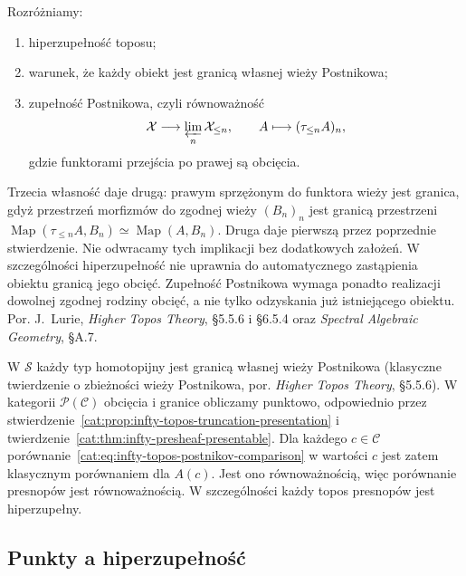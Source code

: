 \begin{uwaga}\label{cat:rem:infty-topos-postnikov-distinctions}
Rozróżniamy:
\begin{enumerate}
 \item hiperzupełność toposu;
 \item warunek, że każdy obiekt jest granicą własnej wieży Postnikowa;
 \item zupełność Postnikowa, czyli równoważność
 \[
 \mathcal X\longrightarrow
 \varprojlim_n\mathcal X_{\leq n},
 \qquad A\longmapsto(\tau_{\leq n}A)_n,
 \]
 gdzie funktorami przejścia po prawej są obcięcia.
\end{enumerate}
Trzecia własność daje drugą: prawym sprzężonym do funktora wieży jest granica, gdyż przestrzeń morfizmów do zgodnej wieży $(B_n)_n$ jest granicą przestrzeni $\operatorname{Map}(\tau_{\leq n}A,B_n)\simeq\operatorname{Map}(A,B_n)$. Druga daje pierwszą przez poprzednie stwierdzenie. Nie odwracamy tych implikacji bez dodatkowych założeń. W szczególności hiperzupełność nie uprawnia do automatycznego zastąpienia obiektu granicą jego obcięć. Zupełność Postnikowa wymaga ponadto realizacji dowolnej zgodnej rodziny obcięć, a nie tylko odzyskania już istniejącego obiektu. Por. J.~Lurie, \emph{Higher Topos Theory}, \S5.5.6 i \S6.5.4 oraz \emph{Spectral Algebraic Geometry}, \S A.7.
\end{uwaga}

\begin{przyklad}\label{cat:ex:infty-topos-presheaf-postnikov}
W $\mathcal S$ każdy typ homotopijny jest granicą własnej wieży Postnikowa (klasyczne twierdzenie o zbieżności wieży Postnikowa, por. \emph{Higher Topos Theory}, \S5.5.6). W kategorii $\mathcal P(\mathcal C)$ obcięcia i granice obliczamy punktowo, odpowiednio przez stwierdzenie~\ref{cat:prop:infty-topos-truncation-presentation} i twierdzenie~\ref{cat:thm:infty-presheaf-presentable}. Dla każdego $c\in\mathcal C$ porównanie~\eqref{cat:eq:infty-topos-postnikov-comparison} w wartości $c$ jest zatem klasycznym porównaniem dla $A(c)$. Jest ono równoważnością, więc porównanie presnopów jest równoważnością. W szczególności każdy topos presnopów jest hiperzupełny.
\end{przyklad}

\subsection{Punkty a hiperzupełność}

